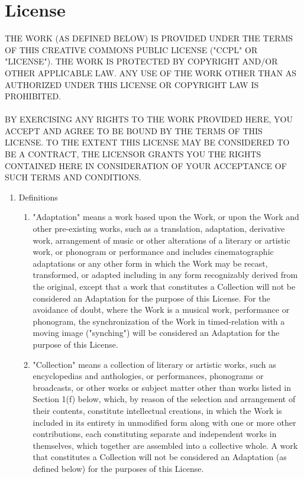 \documentclass{article}
\begin{document}
\section{License}
{\tiny THE WORK (AS DEFINED BELOW) IS PROVIDED UNDER THE TERMS OF THIS CREATIVE COMMONS PUBLIC LICENSE ("CCPL" OR "LICENSE"). THE WORK IS PROTECTED BY COPYRIGHT AND/OR OTHER APPLICABLE LAW. ANY USE OF THE WORK OTHER THAN AS AUTHORIZED UNDER THIS LICENSE OR COPYRIGHT LAW IS PROHIBITED.\\
\\
BY EXERCISING ANY RIGHTS TO THE WORK PROVIDED HERE, YOU ACCEPT AND AGREE TO BE BOUND BY THE TERMS OF THIS LICENSE. TO THE EXTENT THIS LICENSE MAY BE CONSIDERED TO BE A CONTRACT, THE LICENSOR GRANTS YOU THE RIGHTS CONTAINED HERE IN CONSIDERATION OF YOUR ACCEPTANCE OF SUCH TERMS AND CONDITIONS.\\
\begin{enumerate}
	\item Definitions
	\begin{enumerate}
		\item "Adaptation" means a work based upon the Work, or upon the Work and other pre-existing works, such as a translation, adaptation, derivative work, arrangement of music or other alterations of a literary or artistic work, or phonogram or performance and includes cinematographic adaptations or any other form in which the Work may be recast, transformed, or adapted including in any form recognizably derived from the original, except that a work that constitutes a Collection will not be considered an Adaptation for the purpose of this License. For the avoidance of doubt, where the Work is a musical work, performance or phonogram, the synchronization of the Work in timed-relation with a moving image ("synching") will be considered an Adaptation for the purpose of this License.
		\item "Collection" means a collection of literary or artistic works, such as encyclopedias and anthologies, or performances, phonograms or broadcasts, or other works or subject matter other than works listed in Section 1(f) below, which, by reason of the selection and arrangement of their contents, constitute intellectual creations, in which the Work is included in its entirety in unmodified form along with one or more other contributions, each constituting separate and independent works in themselves, which together are assembled into a collective whole. A work that constitutes a Collection will not be considered an Adaptation (as defined below) for the purposes of this License.

\end{enumerate}
\end{enumerate}}
\end{document}
